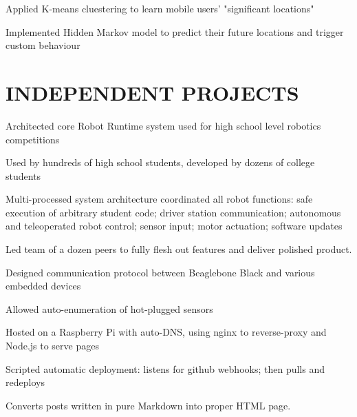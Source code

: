 \documentclass[]{resume}
\begin{document}
\begin{minipage}[t]{0.66\textwidth}
\begin{tightemize}
\item Applied K-means cluestering to learn mobile users' "significant locations"
\item Implemented Hidden Markov model to predict their future locations and trigger custom behaviour
\end{tightemize}
\sectionsep



\section{INDEPENDENT PROJECTS}

\begin{tightemize}
\item Architected core Robot Runtime system used for high school level robotics competitions
\item Used by hundreds of high school students, developed by dozens of college students
\item Multi-processed system architecture coordinated all robot functions: safe execution of arbitrary student code; driver station communication; autonomous and teleoperated robot control; sensor input; motor actuation; software updates
\item Led team of a dozen peers to fully flesh out features and deliver polished product.
\item Designed communication protocol between Beaglebone Black and various embedded devices
\item Allowed auto-enumeration of hot-plugged sensors
\end{tightemize}
\sectionsep

\begin{tightemize}
\item Hosted on a Raspberry Pi with auto-DNS, using nginx to reverse-proxy and Node.js to serve pages
\item Scripted automatic deployment: listens for github webhooks; then pulls and redeploys
\item Converts posts written in pure Markdown into proper HTML page.
\end{tightemize}
\sectionsep


\end{minipage}
\end{document}
